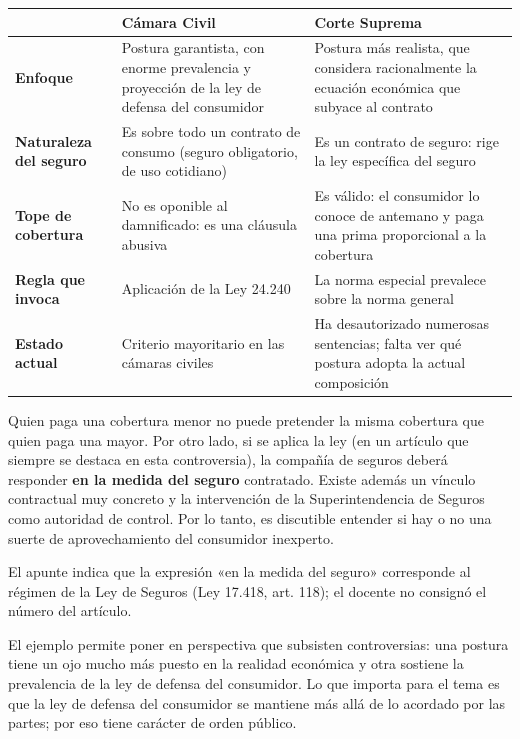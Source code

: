 \documentclass[12pt,oneside]{book}
\begin{document}
\begin{table}[H]
\centering
\renewcommand{\arraystretch}{1.25}
\begin{tabularx}{\textwidth}{
    >{\raggedright\arraybackslash}p{}
    >{\raggedright\arraybackslash}X
    >{\raggedright\arraybackslash}X
}
\toprule
 & \textbf{Cámara Civil} & \textbf{Corte Suprema} \\
\midrule
\textbf{Enfoque} & Postura garantista, con enorme prevalencia y proyección de la ley de defensa del consumidor & Postura más realista, que considera racionalmente la ecuación económica que subyace al contrato \\
\textbf{Naturaleza del seguro} & Es sobre todo un contrato de consumo (seguro obligatorio, de uso cotidiano) & Es un contrato de seguro: rige la ley específica del seguro \\
\textbf{Tope de cobertura} & No es oponible al damnificado: es una cláusula abusiva & Es válido: el consumidor lo conoce de antemano y paga una prima proporcional a la cobertura \\
\textbf{Regla que invoca} & Aplicación de la Ley 24.240 & La norma especial prevalece sobre la norma general \\
\textbf{Estado actual} & Criterio mayoritario en las cámaras civiles & Ha desautorizado numerosas sentencias; falta ver qué postura adopta la actual composición \\
\bottomrule
\end{tabularx}
\end{table}

Quien paga una cobertura menor no puede pretender la misma cobertura que quien paga una mayor. Por otro lado, si se aplica la ley (en un artículo que siempre se destaca en esta controversia), la compañía de seguros deberá responder \textbf{en la medida del seguro} contratado. Existe además un vínculo contractual muy concreto y la intervención de la Superintendencia de Seguros como autoridad de control. Por lo tanto, es discutible entender si hay o no una suerte de aprovechamiento del consumidor inexperto.

\begin{note}
El apunte indica que la expresión «en la medida del seguro» corresponde al régimen de la Ley de Seguros (Ley 17.418, art. 118); el docente no consignó el número del artículo.
\end{note}

El ejemplo permite poner en perspectiva que subsisten controversias: una postura tiene un ojo mucho más puesto en la realidad económica y otra sostiene la prevalencia de la ley de defensa del consumidor. Lo que importa para el tema es que la ley de defensa del consumidor se mantiene más allá de lo acordado por las partes; por eso tiene carácter de orden público.
\end{document}
